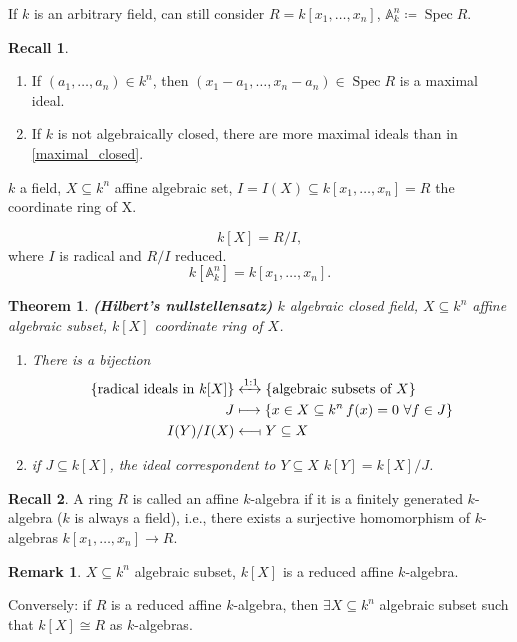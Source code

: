 \documentclass[12pt]{article}
\DeclareMathOperator{\Spec}{Spec}
\newtheorem*{theorem}{Theorem}
\theoremstyle{definition}
\newtheorem*{remark}{Remark}
\newtheorem*{recall}{Recall}
\begin{document}
If $k$ is an arbitrary field, can still consider $R=k[x_1,\ldots,x_n]$, $\mathbb A_k^n\coloneqq\Spec R$.

\begin{recall}
\begin{enumerate}[label=\arabic*)]
\item\label{maximal_closed} If $(a_1,\ldots,a_n)\in k^n$, then $(x_1-a_1,\ldots,x_n-a_n)\in\Spec R$ is a maximal ideal.

\item If $k$ is not algebraically closed, there are more maximal ideals than in \ref{maximal_closed}.
\end{enumerate}
\end{recall}

$k$ a field, $X\subseteq k^n$ affine algebraic set, $I=I(X)\subseteq k[x_1,\ldots,x_n]=R$ the coordinate ring of X.

\[k[X]=R/I,\]
where $I$ is radical and $R/I$ reduced.
\[k[\mathbb A_k^n]=k[x_1,\ldots,x_n].\]

\begin{theorem}
\emph{\textbf{(Hilbert's nullstellensatz)}} $k$ algebraic closed field, $X\subseteq k^n$ affine algebraic subset, $k[X]$ coordinate ring of $X$.

\begin{enumerate}[label=\arabic*)]
\item There is a bijection
\begin{align*}
\{\text{radical ideals in }k[X]\}&\xleftrightarrow{1:1}\{\text{algebraic subsets of }X\}\\J&\longmapsto\{x\in X\subseteq k^n\,f(x)=0\ \forall f\in J\}\\I(Y)/I(X)&\longleftarrow\!\shortmid Y\subseteq X
\end{align*}

\item if $J\subseteq k[X]$, the ideal correspondent to $Y\subseteq X$ $k[Y]=k[X]/J$.
\end{enumerate}
\end{theorem}

\begin{recall}
A ring $R$ is called an affine $k$-algebra if it is a finitely generated $k$-algebra ($k$ is always a field), i.e., there exists a surjective homomorphism of $k$-algebras $k[x_1,\ldots,x_n]\rightarrow R$.
\end{recall}

\begin{remark}
$X\subseteq k^n$ algebraic subset, $k[X]$ is a reduced affine $k$-algebra.

Conversely: if $R$ is a reduced affine $k$-algebra, then $\exists X\subseteq k^n$ algebraic subset such that $k[X]\cong R$ as $k$-algebras.
\end{remark}
\end{document}
